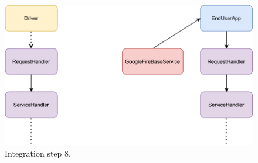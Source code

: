 \begin{figure}[H]
    \centering
    \includegraphics[width=1.0\textwidth]{images/component8.pdf}
    \caption{Integration step 8.}
\end{figure}
